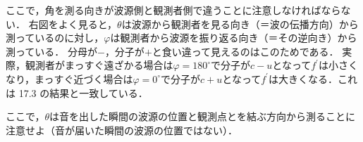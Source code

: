 \hspace{1zw}ここで，{\gtfamily 角を測る向きが波源側と観測者側で違う}ことに注意しなければならない．
右図をよく見ると，$\theta$は{\gtfamily 波源から観測者を見る向き}（＝波の伝播方向）から測っているのに対し，$\varphi$は{\gtfamily 観測者から波源を振り返る向き}（＝その逆向き）から測っている．
分母が$-$，分子が$+$と食い違って見えるのはこのためである．
実際，観測者がまっすぐ遠ざかる場合は$\varphi=180^\circ$で分子が$c-u$となって$f^\prime$は小さくなり，まっすぐ近づく場合は$\varphi=0^\circ$で分子が$c+u$となって$f^\prime$は大きくなる．これは 17.3 の結果と一致している．

\hspace{1zw}ここで，{\gtfamily $\theta$は音を出した瞬間の波源の位置と観測点とを結ぶ方向から測る}ことに注意せよ（音が届いた瞬間の波源の位置ではない）．

